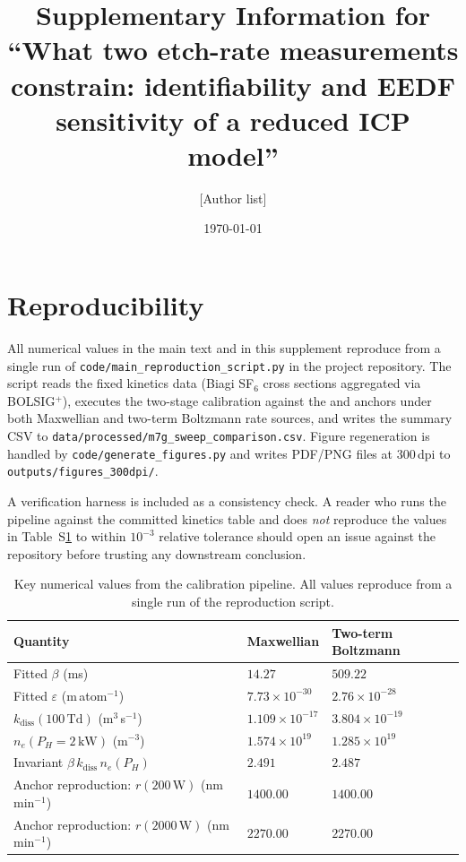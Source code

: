 \documentclass[11pt,a4paper]{article}
\title{Supplementary Information for\\
       ``What two etch-rate measurements constrain:
       identifiability and EEDF sensitivity of a reduced \sfsix{}
       ICP model''}
\author{[Author list]}
\date{\today}
\newcommand{\sfsix}{SF$_6$}
\newcommand{\kdiss}{k_{\mathrm{diss}}}
\newcommand{\nel}{n_e}
\begin{document}
\maketitle

\section{Reproducibility}
\label{sec:SI-repro}

All numerical values in the main text and in this supplement
reproduce from a single run of
\texttt{code/main\_reproduction\_script.py} in the project
repository. The script reads the fixed kinetics data (Biagi \sfsix{}
cross sections aggregated via BOLSIG$^+$), executes the two-stage
calibration against the \citet{mansano1999} and \citet{panduranga2019}
anchors under both Maxwellian and two-term Boltzmann rate sources,
and writes the summary CSV to
\texttt{data/processed/m7g\_sweep\_comparison.csv}. Figure
regeneration is handled by \texttt{code/generate\_figures.py} and
writes PDF/PNG files at 300\,dpi to
\texttt{outputs/figures\_300dpi/}.

A verification harness is included as a consistency check. A
reader who runs the pipeline against the committed kinetics table
and does \emph{not} reproduce the values in Table~S\ref{tab:SI-numbers}
to within $10^{-3}$ relative tolerance should open an issue against
the repository before trusting any downstream conclusion.

\begin{table}[h]
  \centering
  \caption{Key numerical values from the calibration pipeline. All
  values reproduce from a single run of the reproduction script.}
  \label{tab:SI-numbers}
  \small
  \begin{tabular}{lll}
    \toprule
    Quantity & Maxwellian & Two-term Boltzmann \\
    \midrule
    Fitted $\beta$ (ms)                & $14.27$       & $509.22$ \\
    Fitted $\varepsilon$ (m\,atom$^{-1}$)
                                       & $7.73\times 10^{-30}$
                                       & $2.76\times 10^{-28}$ \\
    $\kdiss(100\,\mathrm{Td})$ (m$^3$\,s$^{-1}$)
                                       & $1.109\times 10^{-17}$
                                       & $3.804\times 10^{-19}$ \\
    $\nel(P_H = 2\,\mathrm{kW})$ (m$^{-3}$)
                                       & $1.574\times 10^{19}$
                                       & $1.285\times 10^{19}$ \\
    Invariant $\beta\,\kdiss\,\nel(P_H)$
                                       & $2.491$       & $2.487$ \\
    Anchor reproduction: $r(200\,\mathrm{W})$ (nm\,min$^{-1}$)
                                       & $1400.00$     & $1400.00$ \\
    Anchor reproduction: $r(2000\,\mathrm{W})$ (nm\,min$^{-1}$)
                                       & $2270.00$     & $2270.00$ \\
    \bottomrule
  \end{tabular}
\end{table}
\end{document}
